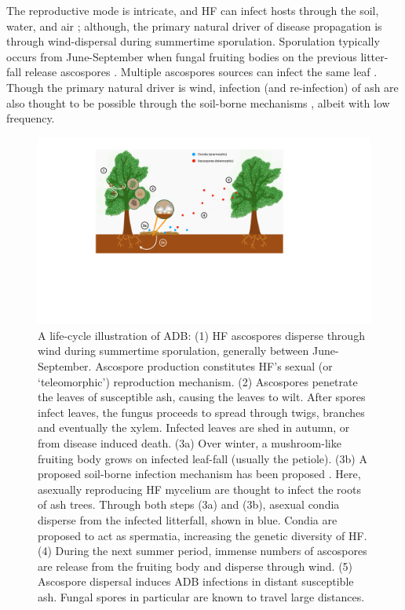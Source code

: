 The reproductive mode is intricate, and HF can infect hosts through the soil,
water, and air \cite{gross2012reproductive}; 
although, the primary natural driver of disease propagation is through wind-dispersal
during summertime sporulation. Sporulation typically occurs from June-September when 
fungal fruiting bodies on the previous litter-fall release ascospores \cite{grosdidier2018tracking, hietala2013invasive}.
Multiple ascospores sources can infect the same leaf \cite{gross2012reproductive}. 
Though the primary natural driver is wind, infection (and re-infection) of ash are also thought to be possible 
through the soil-borne mechanisms \cite{fones2016role}, albeit with low frequency.

\begin{figure}
    \centering
    \includegraphics[scale=0.425]{chapter2/figures/ash-dieback-illustration.pdf}
    \caption{A life-cycle illustration of ADB: 
    (1) HF ascospores disperse through wind during summertime sporulation, generally between June-September.
    Ascospore production constitutes HF's sexual (or `teleomorphic') reproduction mechanism.
    (2) Ascospores penetrate the leaves of susceptible ash, causing the leaves to wilt.
       After spores infect leaves, the fungus proceeds to spread through twigs, branches and eventually the xylem.
       Infected leaves are shed in autumn, or from disease induced death.
    (3a) Over winter, a mushroom-like fruiting body grows on infected leaf-fall (usually the petiole).
    (3b) A proposed soil-borne infection mechanism has been proposed \cite{fones2016role}.
        Here, asexually reproducing HF mycelium are thought to infect the roots of ash trees.
    Through both steps (3a) and (3b), asexual condia disperse from the infected litterfall, shown in blue.
    Condia are proposed to act as spermatia, increasing the genetic diversity of HF.
    (4) During the next summer period, immense numbers of ascospores are release from the fruiting body
    and disperse through wind.
    (5) Ascospore dispersal induces ADB infections in distant susceptible ash. Fungal spores in particular 
    are known to travel large distances.
    }
    \label{fig:my_label}
\end{figure}

